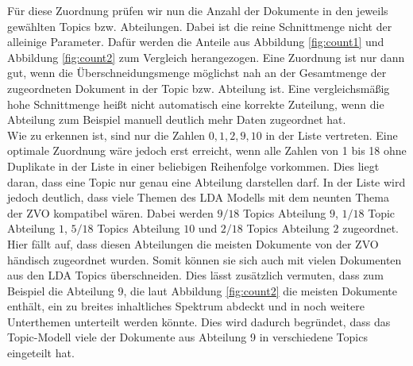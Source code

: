 \documentclass[german,version-2020-11]{uzl-thesis}
\begin{document}
\begin{itemize}
\begin{enumerate}
Für diese Zuordnung prüfen wir nun die Anzahl der Dokumente in den jeweils gewählten Topics bzw. Abteilungen. Dabei ist die reine Schnittmenge nicht der alleinige Parameter. Dafür werden die Anteile aus Abbildung \ref{fig:count1} und Abbildung \ref{fig:count2} zum Vergleich herangezogen. Eine Zuordnung ist nur dann gut, wenn die Überschneidungsmenge möglichst nah an der Gesamtmenge der zugeordneten Dokument in der Topic bzw. Abteilung ist. Eine vergleichsmäßig hohe Schnittmenge heißt nicht automatisch eine korrekte Zuteilung, wenn die Abteilung zum Beispiel manuell deutlich mehr Daten zugeordnet hat.\\


Wie zu erkennen ist, sind nur die Zahlen $ 0,1,2,9,10 $ in der Liste vertreten. Eine optimale Zuordnung wäre jedoch erst erreicht, wenn alle Zahlen von 1 bis 18 ohne Duplikate in der Liste in einer beliebigen Reihenfolge vorkommen. Dies liegt daran, dass eine Topic nur genau eine Abteilung darstellen darf. In der Liste wird jedoch deutlich, dass viele Themen des LDA Modells mit dem neunten Thema der ZVO kompatibel wären. Dabei werden $9/18$ Topics Abteilung $9$, $1/18$ Topic Abteilung $1$, $5/18$ Topics Abteilung $10$ und $2/18$ Topics Abteilung $2$ zugeordnet. Hier fällt auf, dass diesen Abteilungen die meisten Dokumente von der ZVO händisch zugeordnet wurden. Somit können sie sich auch mit vielen Dokumenten aus den LDA Topics überschneiden. Dies lässt zusätzlich vermuten, dass zum Beispiel die Abteilung 9, die laut Abbildung \ref{fig:count2} die meisten Dokumente enthält, ein zu breites inhaltliches Spektrum abdeckt und in noch weitere Unterthemen unterteilt werden könnte. Dies wird dadurch begründet, dass das Topic-Modell viele der Dokumente aus Abteilung 9 in verschiedene Topics eingeteilt hat.\\


\begin{figure}[H]
\begin{center}
\end{center}
\end{figure}
\end{enumerate}
\end{itemize}
\end{document}
